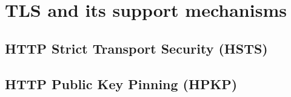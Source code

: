 \section{TLS and its support mechanisms}
\label{section:TLS}

\subsection{HTTP Strict Transport Security (HSTS)}
\label{subsection:HSTS}


\subsection{HTTP Public Key Pinning (HPKP)}
\label{subsection:HPKP}


